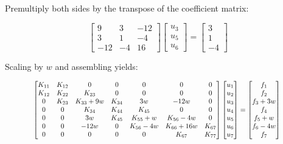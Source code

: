 \documentclass[10pt,b5paper,titlepage]{book}
\begin{document}
Premultiply both sides by the transpose of the coefficient matrix:

\begin{equation}
    \begin{bmatrix}
        9 & 3 & -12 \\
        3 & 1 & -4 \\
        -12 & -4 & 16
    \end{bmatrix}
    \begin{bmatrix}
        u_3 \\
        u_5 \\
        u_6
    \end{bmatrix}
    = \begin{bmatrix}
        3 \\
        1 \\
        -4
    \end{bmatrix}
\end{equation}

Scaling by $ w $ and assembling yields:

\begin{equation}
    \resizebox{0.85\hsize}{!}{%
        $\begin{bmatrix}
            K_{11} & K_{12} & 0 & 0 & 0 & 0 & 0 \\
            K_{12} & K_{22} & K_{23} & 0 & 0 & 0 & 0 \\
            0 & K_{23} & K_{33} + 9 w & K_{34} & 3w & -12w & 0 \\
            0 & 0 & K_{34} & K_{44} & K_{45} & 0 & 0 \\
            0 & 0 & 3w & K_{45} & K_{55} + w & K_{56} - 4w & 0 \\
            0 & 0 & -12w & 0 & K_{56} - 4w & K_{66} + 16w & K_{67} \\
            0 & 0 & 0 & 0 & 0 & K_{67} & K_{77}
        \end{bmatrix}
        \begin{bmatrix}
            u_1 \\
            u_2 \\
            u_3 \\
            u_4 \\
            u_5 \\
            u_6 \\
            u_7
        \end{bmatrix}
        = \begin{bmatrix}
            f_1 \\
            f_2 \\
            f_3 + 3 w \\
            f_4 \\
            f_5 + w \\
            f_6 - 4 w \\
            f_7
        \end{bmatrix}$
    }
\end{equation}
\end{document}
